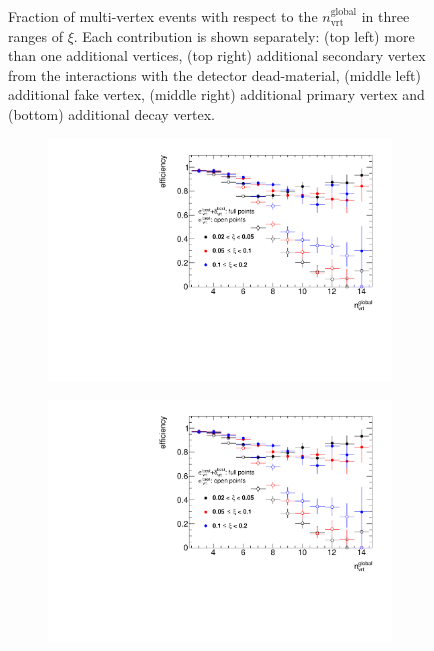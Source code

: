 \begin{figure}[h!]
\begin{subfigure}{.47\textwidth}
	\end{subfigure}
	\begin{minipage}{.47\textwidth}
			\caption{Fraction of multi-vertex events  with respect to the $n_\textrm{vrt}^\textrm{global}$ in three ranges of $\xi$. Each contribution is shown separately: (top left) more than one additional vertices, (top right) additional secondary vertex from the interactions with the detector dead-material, (middle left) additional fake vertex, (middle right) additional primary vertex and (bottom) additional decay vertex.}
			\label{fig:vertexVeto}
	\end{minipage}
\end{figure}
\begin{figure}[h!]
	\centering
	\begin{subfigure}{.47\textwidth}
		\includegraphics[width=\textwidth,page=2]{chapters/chrgSTAR/img/vertex/vertexEffi_ksi.pdf}
	\end{subfigure}
	\begin{subfigure}{.47\textwidth}
		\includegraphics[width=\textwidth,page=9]{chapters/chrgSTAR/img/vertex/vertexEffi_ksi.pdf}

\end{subfigure}
\end{figure}
